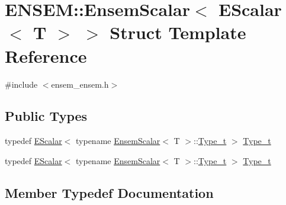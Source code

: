 \hypertarget{structENSEM_1_1EnsemScalar_3_01EScalar_3_01T_01_4_01_4}{}\section{E\+N\+S\+EM\+:\+:Ensem\+Scalar$<$ E\+Scalar$<$ T $>$ $>$ Struct Template Reference}
\label{structENSEM_1_1EnsemScalar_3_01EScalar_3_01T_01_4_01_4}


{\ttfamily \#include $<$ensem\+\_\+ensem.\+h$>$}

\subsection*{Public Types}
\begin{DoxyCompactItemize}
\item 
typedef \mbox{\hyperlink{classENSEM_1_1EScalar}{E\+Scalar}}$<$ typename \mbox{\hyperlink{structENSEM_1_1EnsemScalar}{Ensem\+Scalar}}$<$ T $>$\+::\mbox{\hyperlink{structENSEM_1_1EnsemScalar_3_01EScalar_3_01T_01_4_01_4_a1c2a1f5745c75b422ce4629dcc4d98c9}{Type\+\_\+t}} $>$ \mbox{\hyperlink{structENSEM_1_1EnsemScalar_3_01EScalar_3_01T_01_4_01_4_a1c2a1f5745c75b422ce4629dcc4d98c9}{Type\+\_\+t}}
\item 
typedef \mbox{\hyperlink{classENSEM_1_1EScalar}{E\+Scalar}}$<$ typename \mbox{\hyperlink{structENSEM_1_1EnsemScalar}{Ensem\+Scalar}}$<$ T $>$\+::\mbox{\hyperlink{structENSEM_1_1EnsemScalar_3_01EScalar_3_01T_01_4_01_4_a1c2a1f5745c75b422ce4629dcc4d98c9}{Type\+\_\+t}} $>$ \mbox{\hyperlink{structENSEM_1_1EnsemScalar_3_01EScalar_3_01T_01_4_01_4_a1c2a1f5745c75b422ce4629dcc4d98c9}{Type\+\_\+t}}
\end{DoxyCompactItemize}


\subsection{Member Typedef Documentation}
\mbox{\label{structENSEM_1_1EnsemScalar_3_01EScalar_3_01T_01_4_01_4_a1c2a1f5745c75b422ce4629dcc4d98c9}} 
